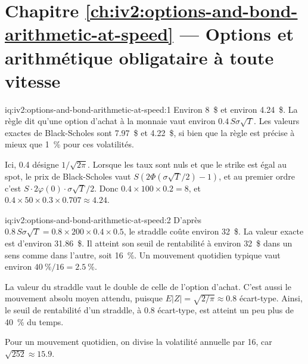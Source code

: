 \section*{Chapitre \ref{ch:iv2:options-and-bond-arithmetic-at-speed} --- Options et arithmétique obligataire à toute vitesse}

\begin{solution}{iq:iv2:options-and-bond-arithmetic-at-speed:1}
Environ 8~\$ et environ 4.24~\$. La règle dit qu'une option d'achat à la monnaie vaut environ $0.4\,S\sigma\sqrt{T}$. Les valeurs exactes de Black-Scholes sont 7.97~\$ et 4.22~\$, si bien que la règle est précise à mieux que 1~\% pour ces volatilités.

Ici, 0.4 désigne $1/\sqrt{2\pi}$. Lorsque les taux sont nuls et que le strike est égal au spot, le prix de Black-Scholes vaut $S(2\Phi(\sigma\sqrt T/2) - 1)$, et au premier ordre c'est $S \cdot 2\varphi(0) \cdot \sigma\sqrt T/2$. Donc $0.4 \times 100 \times 0.2 = 8$, et $0.4 \times 50 \times 0.3 \times 0.707 \approx 4.24$.

\end{solution}

\begin{solution}{iq:iv2:options-and-bond-arithmetic-at-speed:2}
D'après $0.8\,S\sigma\sqrt T = 0.8 \times 200 \times 0.4 \times 0.5$, le straddle coûte environ 32~\$. La valeur exacte est d'environ 31.86~\$. Il atteint son seuil de rentabilité à environ 32~\$ dans un sens comme dans l'autre, soit 16~\%. Un mouvement quotidien typique vaut environ $40~\%/16 = 2.5~\%$.

La valeur du straddle vaut le double de celle de l'option d'achat. C'est aussi le mouvement absolu moyen attendu, puisque $E|Z| = \sqrt{2/\pi} \approx 0.8$ écart-type. Ainsi, le seuil de rentabilité d'un straddle, à 0.8 écart-type, est atteint un peu plus de 40~\% du temps.

Pour un mouvement quotidien, on divise la volatilité annuelle par 16, car $\sqrt{252} \approx 15.9$.

\end{solution}

